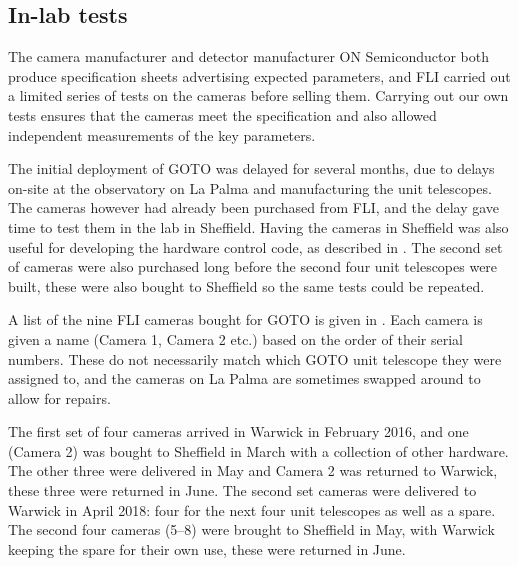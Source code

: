 \begin{colsection}
\begin{colsection}
\clearpage

\end{colsection}

\newpage
\subsection{In-lab tests}
\label{sec:camera_tests}
\begin{colsection}

The camera manufacturer  and detector manufacturer ON Semiconductor both produce specification sheets advertising expected parameters, and FLI carried out a limited series of tests on the cameras before selling them. Carrying out our own tests ensures that the cameras meet the specification and also allowed independent measurements of the key parameters.

The initial deployment of GOTO was delayed for several months, due to delays on-site at the observatory on La Palma and manufacturing the unit telescopes. The cameras however had already been purchased from FLI, and the delay gave time to test them in the lab in Sheffield. Having the cameras in Sheffield was also useful for developing the hardware control code, as described in . The second set of cameras were also purchased long before the second four unit telescopes were built, these were also bought to Sheffield so the same tests could be repeated.

A list of the nine FLI cameras bought for GOTO is given in . Each camera is given a name (Camera 1, Camera 2 etc.) based on the order of their serial numbers. These do not necessarily match which GOTO unit telescope they were assigned to, and the cameras on La Palma are sometimes swapped around to allow for repairs.

The first set of four cameras arrived in Warwick in February 2016, and one (Camera 2) was bought to Sheffield in March with a collection of other hardware. The other three were delivered in May and Camera 2 was returned to Warwick, these three were returned in June. The second set cameras were delivered to Warwick in April 2018: four for the next four unit telescopes as well as a spare. The second four cameras (5--8) were brought to Sheffield in May, with Warwick keeping the spare for their own use, these were returned in June.

\newpage


\end{colsection}
\end{colsection}
